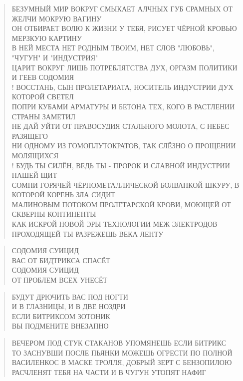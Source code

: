 \poemtitle{***}
\begin{verse}
БЕЗУМНЫЙ МИР ВОКРУГ СМЫКАЕТ АЛЧНЫХ ГУБ СРАМНЫХ ОТ ЖЕЛЧИ МОКРУЮ ВАГИНУ\\
ОН ОТБИРАЕТ ВОЛЮ К ЖИЗНИ У ТЕБЯ, РИСУЕТ ЧЁРНОЙ КРОВЬЮ МЕРЗКУЮ КАРТИНУ\\
В НЕЙ МЕСТА НЕТ РОДНЫМ ТВОИМ, НЕТ СЛОВ "ЛЮБОВЬ", "ЧУГУН" И "ИНДУСТРИЯ"\\
ЦАРИТ ВОКРУГ ЛИШЬ ПОТРЕБЛЯТСТВА ДУХ, ОРГАЗМ ПОЛИТИКИ И ГЕЕВ СОДОМИЯ\\!
ВОССТАНЬ, СЫН ПРОЛЕТАРИАТА, НОСИТЕЛЬ ИНДУСТРИИ ДУХ КОТОРОЙ СВЕТЕЛ\\
ПОПРИ КУБАМИ АРМАТУРЫ И БЕТОНА ТЕХ, КОГО В РАСТЛЕНИИ СТРАНЫ ЗАМЕТИЛ\\
НЕ ДАЙ УЙТИ ОТ ПРАВОСУДИЯ СТАЛЬНОГО МОЛОТА, С НЕБЕС РАЗЯЩЕГО\\
НИ ОДНОМУ ИЗ ГОМОПЛУТОКРАТОВ, ТАК СЛЁЗНО О ПРОЩЕНИИ МОЛЯЩИХСЯ\\!
БУДЬ ТЫ СИЛЁН, ВЕДЬ ТЫ - ПРОРОК И СЛАВНОЙ ИНДУСТРИИ НАШЕЙ ЩИТ\\
СОМНИ ГОРЯЧЕЙ ЧЁРНОМЕТАЛЛИЧЕСКОЙ БОЛВАНКОЙ ШКУРУ, В КОТОРОЙ КОРЕНЬ ЗЛА СИДИТ\\
МАЛИНОВЫМ ПОТОКОМ ПРОЛЕТАРСКОЙ КРОВИ, МОЮЩЕЙ ОТ СКВЕРНЫ КОНТИНЕНТЫ\\
КАК ИСКРОЙ НОВОЙ ЭРЫ ТЕХНОЛОГИИ МЕЖ ЭЛЕКТРОДОВ ПРОХОДЯЩЕЙ ТЫ РАЗРЕЖЕШЬ ВЕКА ЛЕНТУ
\end{verse}

\poemtitle{***}
\begin{verse}
СОДОМИЯ СУИЦИД\\
ВАС ОТ БИДТРИКСА СПАСЁТ\\
СОДОМИЯ СУИЦИД\\
ОТ ПРОБЛЕМ ВСЕХ УНЕСЁТ
\end{verse}

\poemtitle{***}
\begin{verse}
БУДУТ ДРЮЧИТЬ ВАС ПОД НОГТИ\\
И В ГЛАЗНИЦЫ, И В ДВЕ НОЗДРИ\\
ЕСЛИ БИТРИКСОМ ЗОТОНИК\\
ВЫ ПОДМЕНИТЕ ВНЕЗАПНО
\end{verse}

\poemtitle{***}
\begin{verse}
ВЕЧЕРОМ ПОД СТУК СТАКАНОВ УПОМЯНЕШЬ ЕСЛИ БИТРИКС\\
ТО ЗАСНУВШИ ПОСЛЕ ПЬЯНКИ МОЖЕШЬ ОГРЕСТИ ПО ПОЛНОЙ\\
ВАСИЛЕНКОС В МАСКЕ ТРОЛЛЯ, ДОБРЫЙ ЗЕРТ С БЕНЗОПИЛОЮ \\
РАСЧЛЕНЯТ ТЕБЯ НА ЧАСТИ И В ЧУГУН УТОПЯТ НАФИГ
\end{verse}

